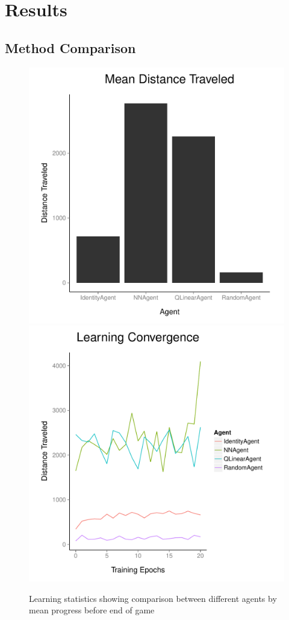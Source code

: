 \documentclass[12pt]{article}
\begin{document}
\section{Results}

\subsection{Method Comparison}

\begin{figure}
\includegraphics[scale=0.5]{imgs/dist_bar.pdf}
\includegraphics[scale=0.5]{imgs/dist_line.pdf}
\caption{Learning statistics showing comparison between different agents by mean progress before end of game}
\label{agent_comp}
\end{figure}
\end{document}
